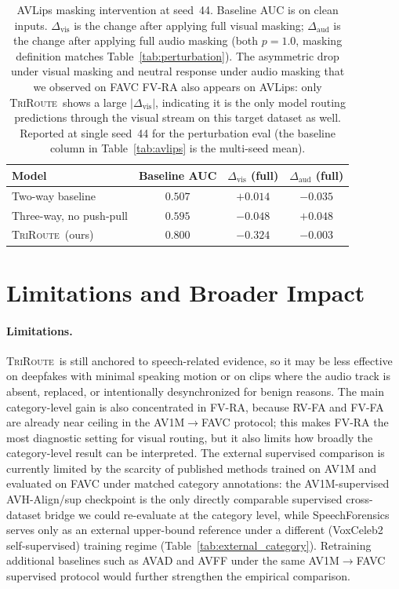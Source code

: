 \documentclass{article}
\newcommand{\method}{\textsc{TriRoute}}
\begin{document}
\begin{table}[t]
    \centering
    \caption{AVLips masking intervention at seed~44. Baseline AUC is on clean inputs. $\Delta_\mathrm{vis}$ is the change after applying full visual masking; $\Delta_\mathrm{aud}$ is the change after applying full audio masking (both $p=1.0$, masking definition matches Table~\ref{tab:perturbation}). The asymmetric drop under visual masking and neutral response under audio masking that we observed on FAVC FV-RA also appears on AVLips: only \method\ shows a large $|\Delta_\mathrm{vis}|$, indicating it is the only model routing predictions through the visual stream on this target dataset as well. Reported at single seed~44 for the perturbation eval (the baseline column in Table~\ref{tab:avlips} is the multi-seed mean).}
    \label{tab:avlips_perturbation}
    \small
    \begin{tabular}{lccc}
        \toprule
        Model & Baseline AUC & $\Delta_\mathrm{vis}$ (full) & $\Delta_\mathrm{aud}$ (full) \\
        \midrule
        Two-way baseline        & $0.507$ & $+0.014$ & $-0.035$ \\
        Three-way, no push-pull & $0.595$ & $-0.048$ & $+0.048$ \\
        \method\ (ours)         & $\mathbf{0.800}$ & $\mathbf{-0.324}$ & $-0.003$ \\
        \bottomrule
    \end{tabular}
\end{table}

\section{Limitations and Broader Impact}

\paragraph{Limitations.}
\method\ is still anchored to speech-related evidence, so it may be less effective on deepfakes with minimal speaking motion or on clips where the audio track is absent, replaced, or intentionally desynchronized for benign reasons. The main category-level gain is also concentrated in FV-RA, because RV-FA and FV-FA are already near ceiling in the AV1M$\rightarrow$FAVC protocol; this makes FV-RA the most diagnostic setting for visual routing, but it also limits how broadly the category-level result can be interpreted. The external supervised comparison is currently limited by the scarcity of published methods trained on AV1M and evaluated on FAVC under matched category annotations: the AV1M-supervised AVH-Align/sup checkpoint is the only directly comparable supervised cross-dataset bridge we could re-evaluate at the category level, while SpeechForensics serves only as an external upper-bound reference under a different (VoxCeleb2 self-supervised) training regime (Table~\ref{tab:external_category}). Retraining additional baselines such as AVAD and AVFF under the same AV1M$\rightarrow$FAVC supervised protocol would further strengthen the empirical comparison.
\end{document}
